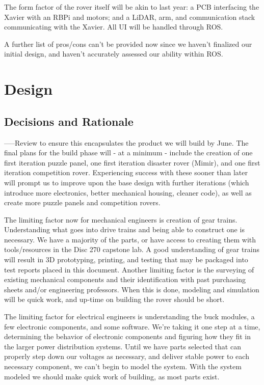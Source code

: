 \documentclass[a4paper, 10pt]{article}
\begin{document}
The form factor of the rover itself will be akin to last year: a PCB interfacing the Xavier with an RBPi and motors; and a LiDAR, arm, and communication stack communicating with the Xavier. All UI will be handled through ROS. 

A further list of pros/cons can't be provided now since we haven't finalized our initial design, and haven't accurately assessed our ability within ROS.

\pagebreak
	
\section{Design}
	\subsection{Decisions and Rationale}
	-----Review to ensure this encapsulates the product we will build by June.
	The final plans for the build phase will - at a minimum - include the creation of one first iteration puzzle panel, one first iteration disaster rover (Mimir), and one first iteration competition rover. Experiencing success with these sooner than later will prompt us to improve upon the base design with further iterations (which introduce more electronics, better mechanical housing, cleaner code), as well as create more puzzle panels and competition rovers.
	
	The limiting factor now for mechanical engineers is creation of gear trains. Understanding what goes into drive trains and being able to construct one is necessary. We have a majority of the parts, or have access to creating them with tools/resources in the Disc 270 capstone lab. A good understanding of gear trains will result in 3D prototyping, printing, and testing that may be packaged into test reports placed in this document. Another limiting factor is the surveying of existing mechanical components and their identification with past purchasing sheets and/or engineering professors. When this is done, modeling and simulation will be quick work, and up-time on building the rover should be short.

	The limiting factor for electrical engineers is understanding the buck modules, a few electronic components, and some software. We're taking it one step at a time, determining the behavior of electronic components and figuring how they fit in the larger power distribution systems. Until we have parts selected that can properly step down our voltages as necessary, and deliver stable power to each necessary component, we can't begin to model the system. With the system modeled we should make quick work of building, as most parts exist.
\end{document}

